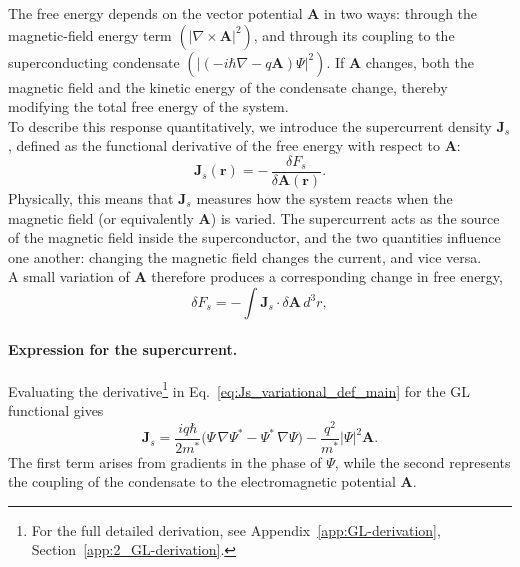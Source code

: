 The free energy depends on the vector potential $\mathbf A$ in two ways:
through the magnetic-field energy term $(|\nabla\times\mathbf A|^2)$, and through its coupling to the superconducting condensate $(|(-i\hbar\nabla - q\mathbf A)\Psi|^2)$.
If $\mathbf A$ changes, both the magnetic field and the kinetic energy of the condensate change, thereby modifying the total free energy of the system.\\
To describe this response quantitatively, we introduce the supercurrent density $\mathbf{J}_s$, defined as the functional derivative of the free energy with respect to $\mathbf A$:
\begin{equation}
\mathbf{J}_s(\mathbf r) = -\,\frac{\delta F_s}{\delta \mathbf A(\mathbf r)}.
\label{eq:Js_variational_def_main}
\end{equation}
Physically, this means that $\mathbf{J}_s$ measures how the system reacts when the magnetic field (or equivalently $\mathbf A$) is varied.
The supercurrent acts as the source of the magnetic field inside the superconductor, and the two quantities influence one another: changing the magnetic field changes the current, and vice versa.\\
A small variation of $\mathbf A$ therefore produces a corresponding change in free energy,
\[
\delta F_s = -\!\int \mathbf J_s \cdot \delta\mathbf A\, d^3r,
\]

\paragraph{Expression for the supercurrent.}
Evaluating the derivative\footnote{%
For the full detailed derivation, see Appendix~\ref{app:GL-derivation}, 
Section~\ref{app:2_GL-derivation}.} in Eq.~\eqref{eq:Js_variational_def_main} for the GL functional gives
\begin{equation}
\boxed{
\mathbf{J}_s =
\frac{i q \hbar}{2 m^*}\bigl(\Psi\,\nabla\Psi^* - \Psi^*\,\nabla\Psi\bigr)
- \frac{q^2}{m^*}|\Psi|^2\mathbf{A}.
}
\label{eq:Js_expression_main}
\end{equation}
The first term arises from gradients in the phase of $\Psi$,
while the second represents the coupling of the condensate to the electromagnetic potential $\mathbf A$.

